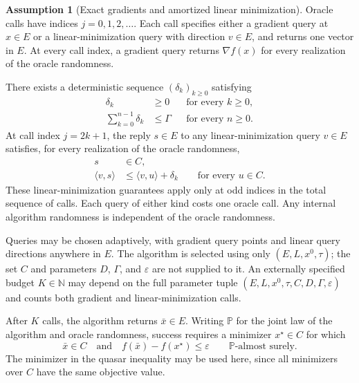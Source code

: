 \documentclass[10pt]{article}
\theoremstyle{definition}
\newtheorem{assumption}{Assumption}
\begin{document}
\begin{assumption}[Exact gradients and amortized linear minimization]
Oracle calls have indices $j=0,1,2,\ldots$. Each call specifies either a gradient query at $x\in E$ or a linear-minimization query with direction $v\in E$, and returns one vector in $E$. At every call index, a gradient query returns $\nabla f(x)$ for every realization of the oracle randomness.

There exists a deterministic sequence $(\delta_k)_{k\geq0}$ satisfying
\[
\begin{aligned}
\delta_k&\geq0 &&\text{for every }k\geq0,\\
\sum_{k=0}^{n-1}\delta_k&\leq\Gamma
&&\text{for every }n\geq0.
\end{aligned}
\]
At call index $j=2k+1$, the reply $s\in E$ to any linear-minimization query $v\in E$ satisfies, for every realization of the oracle randomness,
\[
\begin{aligned}
s&\in C,\\
\langle v,s\rangle&\leq\langle v,u\rangle+\delta_k
\qquad\text{for every }u\in C.
\end{aligned}
\]
These linear-minimization guarantees apply only at odd indices in the total sequence of calls. Each query of either kind costs one oracle call. Any internal algorithm randomness is independent of the oracle randomness.
\end{assumption}

Queries may be chosen adaptively, with gradient query points and linear query directions anywhere in $E$. The algorithm is selected using only $(E,L,x^0,\tau)$; the set $C$ and parameters $D$, $\Gamma$, and $\varepsilon$ are not supplied to it. An externally specified budget $K\in\mathbb{N}$ may depend on the full parameter tuple $(E,L,x^0,\tau,C,D,\Gamma,\varepsilon)$ and counts both gradient and linear-minimization calls.

After $K$ calls, the algorithm returns $\bar{x}\in E$. Writing $\mathbb{P}$ for the joint law of the algorithm and oracle randomness, success requires a minimizer $x^\star\in C$ for which
\[
\bar{x}\in C
\quad\text{and}\quad
f(\bar{x})-f(x^\star)\leq\varepsilon
\qquad\mathbb{P}\text{-almost surely}.
\]
The minimizer in the quasar inequality may be used here, since all minimizers over $C$ have the same objective value.
\end{document}
